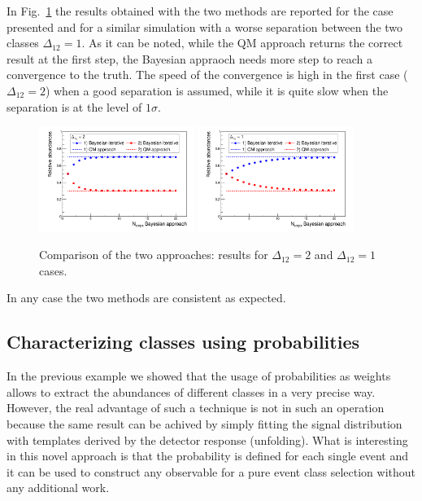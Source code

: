 In Fig.~\ref{fig:IterGaus2} the results obtained with the two methods are
reported for the case presented and for a similar simulation with a worse
separation between the two classes $\Delta_{12} = 1$.
As it can be noted, while the QM approach returns the correct result at the
first step, the Bayesian appraoch needs more step to reach a convergence to
the truth. The speed of the convergence is high in the first case
($\Delta_{12} = 2$) when a good separation is assumed, while it is quite slow
when the separation is at the level of $1\sigma$.

\begin{figure}[!htb]
\centering
\includegraphics[width=0.45\textwidth]{../png/figIterativeDelta2.png}
\includegraphics[width=0.45\textwidth]{../png/figIterativeDelta1.png}
\caption{Comparison of the two approaches: results for $\Delta_{12} = 2$ and
  $\Delta_{12} = 1$ cases.}
\label{fig:IterGaus2}
\end{figure}

In any case the two methods are consistent as expected.

\subsection{Characterizing classes using probabilities}
In the previous example we showed that the usage of probabilities as weights
allows to extract the abundances of different classes in a very precise way.
However, the real advantage of such a technique is not in such an operation
because the same result can be achived by simply fitting the signal
distribution with templates derived by the detector response (unfolding).
What is interesting in this novel approach is that the probability is defined
for each single event and it can be used to construct any observable for a
pure event class selection without any additional work.

